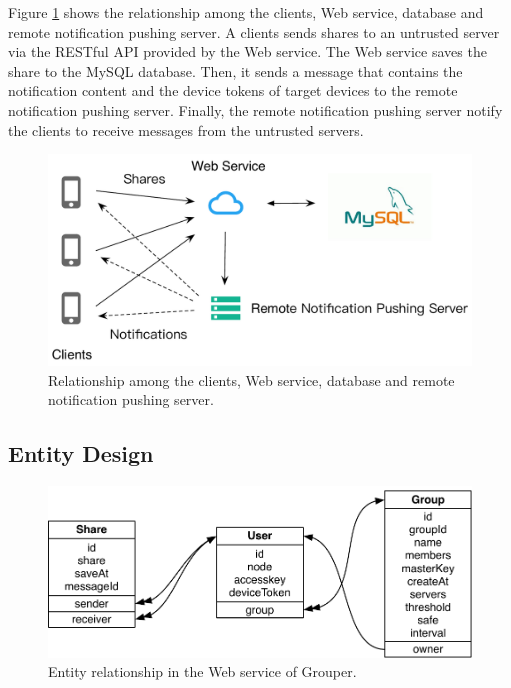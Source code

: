 \documentclass[a4paper,11pt]{report}
\begin{document}
Figure \ref{fig:server_client} shows the relationship among the clients, Web service, database and remote notification pushing server.
A clients sends shares to an untrusted server via the RESTful API provided by the Web service.
The Web service saves the share to the MySQL database.
Then, it sends a message that contains the notification content and the device tokens of target devices to the remote notification pushing server.
Finally, the remote notification pushing server notify the clients to receive messages from the untrusted servers.

\begin{figure}
	\centering
	\includegraphics[scale=0.6]{server_client}
	\caption{Relationship among the clients, Web service, database and remote notification pushing server.}
	\label{fig:server_client}
\end{figure}

\subsection{Entity Design}

\begin{figure}
	\centering
	\includegraphics[scale=0.75]{server_entities}
	\caption{Entity relationship in the Web service of Grouper.}
	\label{fig:server_entities}
\end{figure}
\end{document}
